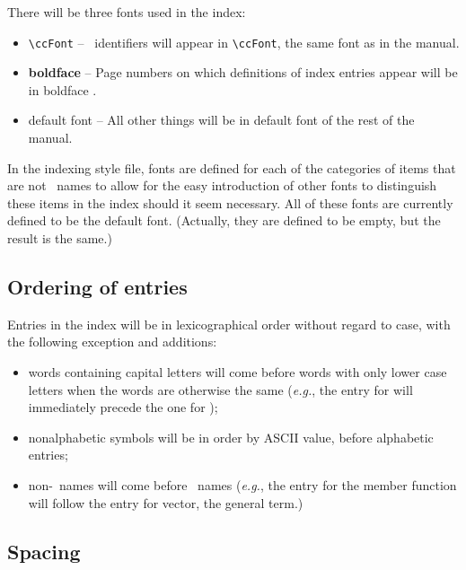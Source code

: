 \documentclass{article}
\begin{document}
There will be three fonts used in the index:
\begin{itemize}
   \item {\verb|\ccFont| } -- \CC\ identifiers will appear in \verb|\ccFont|,
         the same font as in the manual.
   \item {\bf boldface} -- Page numbers on which definitions
         of index entries appear will be in boldface%
         .
   \item {default font} -- All other things will be in default font
         of the rest of the manual.
\end{itemize}

In the indexing style file, fonts are defined for each of the categories
of items that are not \CC\ names to allow for the easy introduction of other
fonts to distinguish these items in the index should it seem necessary.  
All of these fonts are currently defined to be the default font.
(Actually, they are defined to be empty, but the result is the same.)%

\subsection{Ordering of entries}%
%
\label{ordering}

Entries in the index will be in lexicographical order without regard to
case, with the following exception and additions:  
\begin{itemize}
   \item words containing capital letters will come before words with
         only lower case letters when the words
         are otherwise the same
         ({\em e.g.}, the entry for  will 
          immediately precede the one for );
   \item nonalphabetic symbols will be in order by ASCII value, before 
         alphabetic entries;  
   \item non-\CC\ names will come before \CC\ names
         ({\em e.g.}, the entry for the member function  
          will follow the entry for vector, the general term.)
\end{itemize}
%

\subsection{Spacing}%
\label{spacing}
\end{document}
